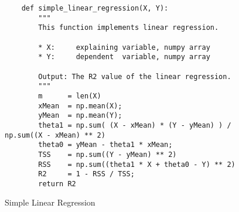 \begin{figure}[!ht]
\centering
\begin{verbatim}
    def simple_linear_regression(X, Y):
        """
        This function implements linear regression.
        
        * X:     explaining variable, numpy array
        * Y:     dependent  variable, numpy array   
    
        Output: The R2 value of the linear regression.
        """
        m      = len(X)
        xMean  = np.mean(X);
        yMean  = np.mean(Y);
        theta1 = np.sum( (X - xMean) * (Y - yMean) ) / np.sum((X - xMean) ** 2)
        theta0 = yMean - theta1 * xMean;
        TSS    = np.sum((Y - yMean) ** 2)
        RSS    = np.sum((theta1 * X + theta0 - Y) ** 2)
        R2     = 1 - RSS / TSS;
        return R2
\end{verbatim}
\vspace*{-0.3cm}
\caption{Simple Linear Regression}
\label{fig:simple_linear_regression.py}
\end{figure}


